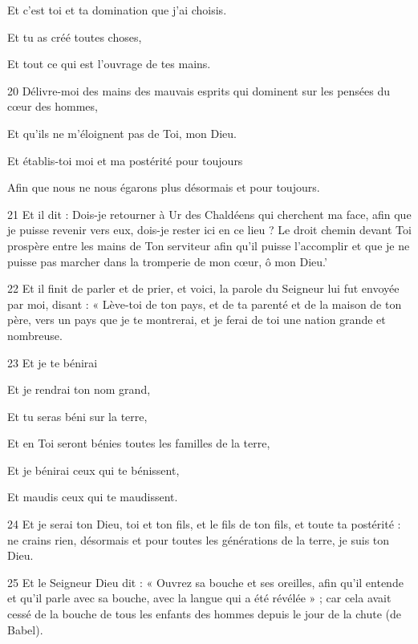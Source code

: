 \par     Et c'est toi et ta domination que j'ai choisis.  
\par     Et tu as créé toutes choses,  
\par     Et tout ce qui est l'ouvrage de tes mains.
\par    
\par 20 Délivre-moi des mains des mauvais esprits qui dominent sur les pensées du cœur des hommes,  
\par     Et qu'ils ne m'éloignent pas de Toi, mon Dieu.
\par    
\par     Et établis-toi moi et ma postérité pour toujours  
\par     Afin que nous ne nous égarons plus désormais et pour toujours.
\par    
\par 21 Et il dit : Dois-je retourner à Ur des Chaldéens qui cherchent ma face, afin que je puisse revenir vers eux, dois-je rester ici en ce lieu ? Le droit chemin devant Toi prospère entre les mains de Ton serviteur afin qu'il puisse l'accomplir et que je ne puisse pas marcher dans la tromperie de mon cœur, ô mon Dieu.'
\par 22 Et il finit de parler et de prier, et voici, la parole du Seigneur lui fut envoyée par moi, disant : « Lève-toi de ton pays, et de ta parenté et de la maison de ton père, vers un pays que je te montrerai, et je ferai de toi une nation grande et nombreuse.
\par    
\par 23 Et je te bénirai  
\par     Et je rendrai ton nom grand,  
\par     Et tu seras béni sur la terre,  
\par     Et en Toi seront bénies toutes les familles de la terre,  
\par     Et je bénirai ceux qui te bénissent,  
\par     Et maudis ceux qui te maudissent.
\par    
\par 24 Et je serai ton Dieu, toi et ton fils, et le fils de ton fils, et toute ta postérité : ne crains rien, désormais et pour toutes les générations de la terre, je suis ton Dieu.
\par 25 Et le Seigneur Dieu dit : « Ouvrez sa bouche et ses oreilles, afin qu'il entende et qu'il parle avec sa bouche, avec la langue qui a été révélée » ; car cela avait cessé de la bouche de tous les enfants des hommes depuis le jour de la chute (de Babel).
